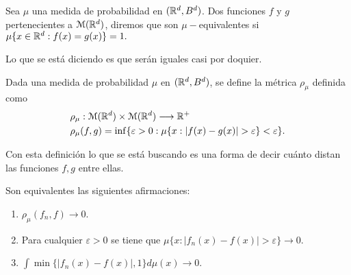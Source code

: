 \begin{definicion} \label{definition:equivalencia_funciones}
    Sea $\mu$ una medida de probabilidad en $(\mathbb{R}^d, B^d)$.  Dos funciones 
    $f$ y $g$ pertenecientes a $\mathcal{M}(\mathbb{R}^d)$, diremos que son $\mu -$equivalentes 
    si $\mu\{ x \in \mathbb{R}^d : f(x)=g(x) \} = 1.$
\end{definicion}

Lo que se está diciendo es que serán iguales casi por doquier.   
\begin{definicion}  \label{definition:distancia-probabilidad}
    Dada una medida de probabilidad $\mu$ en $(\mathbb{R}^d, B^d)$, se define 
    la métrica $\rho_{\mu}$ definida como 
    \begin{equation}
        \begin{split}
            & \rho_{\mu} : \mathcal{M}(\mathbb{R}^d) \times \mathcal{M}(\mathbb{R}^d) \longrightarrow \mathbb{R}^+ \\
            & \rho_{\mu}(f,g) = \inf \{ \varepsilon > 0: \mu \{ x : |f(x) - g(x)| > \varepsilon \} < \varepsilon \}.
        \end{split}
    \end{equation}
\end{definicion}  

Con esta definición lo que se está buscando es una forma de decir cuánto 
distan las funciones $f,g$ entre ellas.  


\begin{lema}\label{lema:caracterizacionConvergenciaSucesiones2_1}
    Son equivalentes las siguientes afirmaciones: 
    \begin{enumerate}
        \item $\rho_{\mu}(f_n, f) \longrightarrow 0$.
        \item Para cualquier  $\varepsilon > 0$ se tiene que $\mu \{  x : |f_n(x) - f(x)| > \varepsilon \} \longrightarrow 0$.
        \item $\int \min \{ |f_n(x) - f(x)|, 1\} d\mu(x) \longrightarrow 0.$
    \end{enumerate}
\end{lema}

